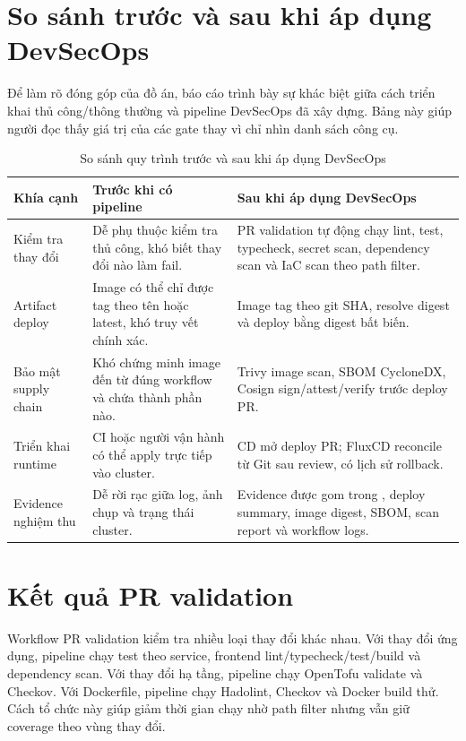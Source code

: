 \section{So sánh trước và sau khi áp dụng DevSecOps}

Để làm rõ đóng góp của đồ án, báo cáo trình bày sự khác biệt giữa cách triển khai thủ công/thông thường và pipeline DevSecOps đã xây dựng. Bảng này giúp người đọc thấy giá trị của các gate thay vì chỉ nhìn danh sách công cụ.

\begin{table}[H]
\centering
\caption{So sánh quy trình trước và sau khi áp dụng DevSecOps}
\label{tab:before-after-devsecops}
\begin{tabularx}{\textwidth}{|p{}|Y|Y|}
\hline
\textbf{Khía cạnh} & \textbf{Trước khi có pipeline} & \textbf{Sau khi áp dụng DevSecOps} \\
\hline
Kiểm tra thay đổi & Dễ phụ thuộc kiểm tra thủ công, khó biết thay đổi nào làm fail. & PR validation tự động chạy lint, test, typecheck, secret scan, dependency scan và IaC scan theo path filter. \\
Artifact deploy & Image có thể chỉ được tag theo tên hoặc latest, khó truy vết chính xác. & Image tag theo git SHA, resolve digest và deploy bằng digest bất biến. \\
Bảo mật supply chain & Khó chứng minh image đến từ đúng workflow và chứa thành phần nào. & Trivy image scan, SBOM CycloneDX, Cosign sign/attest/verify trước deploy PR. \\
Triển khai runtime & CI hoặc người vận hành có thể apply trực tiếp vào cluster. & CD mở deploy PR; FluxCD reconcile từ Git sau review, có lịch sử rollback. \\
Evidence nghiệm thu & Dễ rời rạc giữa log, ảnh chụp và trạng thái cluster. & Evidence được gom trong , deploy summary, image digest, SBOM, scan report và workflow logs. \\
\hline
\end{tabularx}
\end{table}

\section{Kết quả PR validation}

Workflow PR validation kiểm tra nhiều loại thay đổi khác nhau. Với thay đổi ứng dụng, pipeline chạy test theo service, frontend lint/typecheck/test/build và dependency scan. Với thay đổi hạ tầng, pipeline chạy OpenTofu validate và Checkov. Với Dockerfile, pipeline chạy Hadolint, Checkov và Docker build thử. Cách tổ chức này giúp giảm thời gian chạy nhờ path filter nhưng vẫn giữ coverage theo vùng thay đổi.

